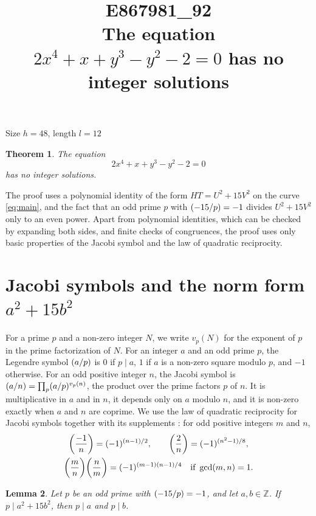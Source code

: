 \documentclass[11pt]{article}
\title{\textbf{E867981\_92}\\[4pt] {\Large The equation $2x^{4}+x+y^{3}-y^{2}-2=0$ has no integer solutions}}
\author{}
\date{}
\newtheorem{theorem}{Theorem}
\newtheorem{lemma}[theorem]{Lemma}
\newcommand{\Z}{\mathbb{Z}}
\newcommand{\leg}[2]{\mathchoice{\biggl(\dfrac{#1}{#2}\biggr)}{(#1/#2)}{(#1/#2)}{(#1/#2)}}
\begin{document}
\maketitle
\vspace{-8ex}
\begin{center}
Size $h=48$, length $l=12$
\end{center}

\begin{theorem}\label{thm:main}
The equation
\begin{equation}\label{eq:main}
2x^{4}+x+y^{3}-y^{2}-2=0
\end{equation}
has no integer solutions.
\end{theorem}

The proof uses a polynomial identity of the form $HT=U^2+15V^2$ on the curve \eqref{eq:main}, and the fact that an odd prime $p$ with $\leg{-15}{p}=-1$ divides $U^2+15V^2$ only to an even power. Apart from polynomial identities, which can be checked by expanding both sides, and finite checks of congruences, the proof uses only basic properties of the Jacobi symbol and the law of quadratic reciprocity.

\section{\texorpdfstring{Jacobi symbols and the norm form $a^2+15b^2$}{Jacobi symbols and the norm form}}

For a prime $p$ and a non-zero integer $N$, we write $v_p(N)$ for the exponent of $p$ in the prime factorization of $N$. For an integer $a$ and an odd prime $p$, the Legendre symbol $\leg{a}{p}$ is $0$ if $p\mid a$, $1$ if $a$ is a non-zero square modulo $p$, and $-1$ otherwise. For an odd positive integer $n$, the Jacobi symbol is $\leg{a}{n}=\prod_p\leg{a}{p}^{v_p(n)}$, the product over the prime factors $p$ of $n$. It is multiplicative in $a$ and in $n$, it depends only on $a$ modulo $n$, and it is non-zero exactly when $a$ and $n$ are coprime. We use the law of quadratic reciprocity for Jacobi symbols together with its supplements \cite[Chapter~5, \S2]{IR}: for odd positive integers $m$ and $n$,
\begin{gather*}
\leg{-1}{n}=(-1)^{(n-1)/2},\qquad\leg{2}{n}=(-1)^{(n^2-1)/8},\\
\leg{m}{n}\leg{n}{m}=(-1)^{(m-1)(n-1)/4}\quad\text{if }\gcd(m,n)=1.
\end{gather*}

\begin{lemma}\label{lem:divides}
Let $p$ be an odd prime with $\leg{-15}{p}=-1$, and let $a,b\in\Z$. If $p\mid a^2+15b^2$, then $p\mid a$ and $p\mid b$.
\end{lemma}
\end{document}
